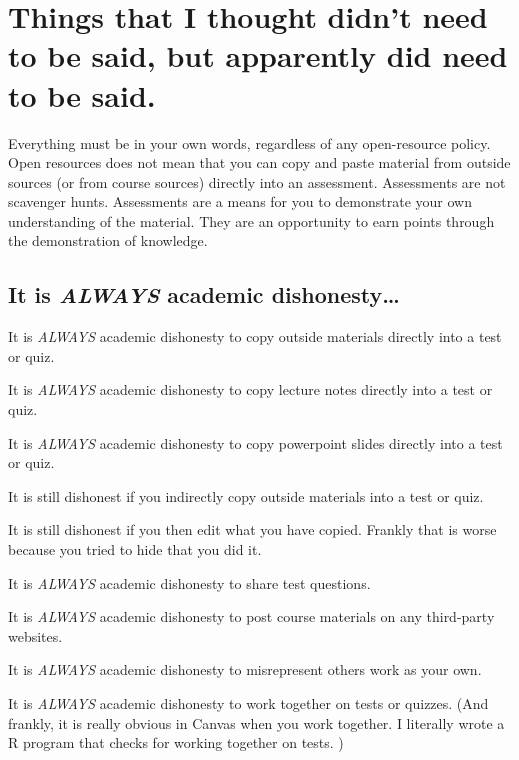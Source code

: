 \hypertarget{things-that-i-thought-didnt-need-to-be-said-but-apparently-did-need-to-be-said.}{%
\section{Things that I thought didn't need to be said, but apparently did need to be said.}\label{things-that-i-thought-didnt-need-to-be-said-but-apparently-did-need-to-be-said.}}

Everything must be in your own words, regardless of any open-resource policy.
Open resources does not mean that you can copy and paste material from outside sources (or from course sources) directly into an assessment.
Assessments are not scavenger hunts.
Assessments are a means for you to demonstrate your own understanding of the material.
They are an opportunity to earn points through the demonstration of knowledge.

\hypertarget{it-is-always-academic-dishonesty}{%
\subsection{\texorpdfstring{It is \emph{ALWAYS} academic dishonesty\ldots{}}{It is ALWAYS academic dishonesty\ldots{}}}\label{it-is-always-academic-dishonesty}}

It is \emph{ALWAYS} academic dishonesty to copy outside materials directly into a test or quiz.

It is \emph{ALWAYS} academic dishonesty to copy lecture notes directly into a test or quiz.

It is \emph{ALWAYS} academic dishonesty to copy powerpoint slides directly into a test or quiz.

It is still dishonest if you indirectly copy outside materials into a test or quiz.

It is still dishonest if you then edit what you have copied. Frankly that is worse because you tried to hide that you did it.

It is \emph{ALWAYS} academic dishonesty to share test questions.

It is \emph{ALWAYS} academic dishonesty to post course materials on any third-party websites.

It is \emph{ALWAYS} academic dishonesty to misrepresent others work as your own.

It is \emph{ALWAYS} academic dishonesty to work together on tests or quizzes.
(And frankly, it is really obvious in Canvas when you work together.
I literally wrote a R program that checks for working together on tests. )

